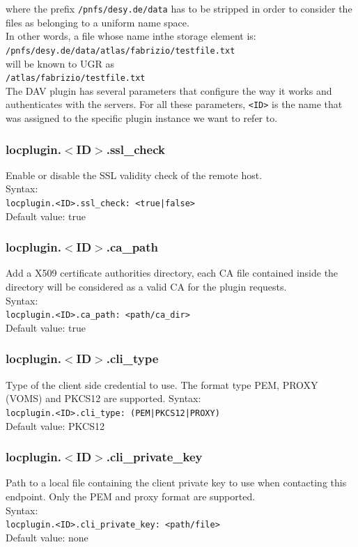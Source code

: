 \documentclass[12pt]{article} %
\begin{document}
where the prefix \lstinline"/pnfs/desy.de/data" has to be stripped in order to consider the files as belonging to a uniform name space.\\

In other words, a file whose name inthe storage element is:\\
\lstinline"/pnfs/desy.de/data/atlas/fabrizio/testfile.txt"\\

will be known to UGR as\\
\lstinline"/atlas/fabrizio/testfile.txt"\\

The DAV plugin has several parameters that configure the way it works and authenticates with the servers. For all these parameters, \lstinline"<ID>" is the name that was assigned to the specific plugin instance we want to refer to.

\subsubsection{locplugin.$<$ID$>$.ssl\_check}
Enable or disable the SSL validity check of the remote host.\\
Syntax:\\
\lstinline"locplugin.<ID>.ssl_check: <true|false>"\\
Default value: true\\
\subsubsection{locplugin.$<$ID$>$.ca\_path}
Add a X509 certificate authorities directory, each CA file contained inside the directory will be considered as a valid CA for the plugin requests.\\
Syntax:\\
\lstinline"locplugin.<ID>.ca_path: <path/ca_dir>"\\
Default value: true\\
\subsubsection{locplugin.$<$ID$>$.cli\_type}
Type of the client side credential to use. The format type PEM, PROXY (VOMS) and PKCS12 are supported.
Syntax:\\
\lstinline"locplugin.<ID>.cli_type: (PEM|PKCS12|PROXY)"\\
Default value: PKCS12\\
\subsubsection{locplugin.$<$ID$>$.cli\_private\_key}
Path to a local file containing the client private key to use when contacting this endpoint. Only the PEM and proxy format are supported.\\
Syntax:\\
\lstinline"locplugin.<ID>.cli_private_key: <path/file>"\\
Default value: none\\
\end{document}
